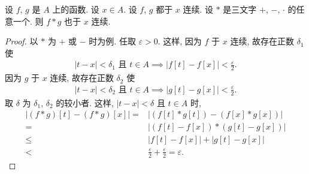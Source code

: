 \begin{theorem}
    设 $f$, $g$ 是 $A$ 上的函数. 设 $x \in A$. 设 $f$, $g$ 都于 $x$ 连续. 设 $\ast$ 是三文字 $+$, $-$, $\cdot$ 的任意一个. 则 $f \ast g$ 也于 $x$ 连续.
\end{theorem}

\begin{proof}
    以 $\ast$ 为 $+$ 或 $-$ 时为例. 任取 $\varepsilon > 0$. 这样, 因为 $f$ 于 $x$ 连续, 故存在正数 $\delta_1$ 使
    \begin{align*}
        \text{$|t - x| < \delta_1$ 且 $t \in A$} \implies |f[t] - f[x]| < \frac{\varepsilon}{2}.
    \end{align*}
    因为 $g$ 于 $x$ 连续, 故存在正数 $\delta_2$ 使
    \begin{align*}
        \text{$|t - x| < \delta_2$ 且 $t \in A$} \implies |g[t] - g[x]| < \frac{\varepsilon}{2}.
    \end{align*}
    取 $\delta$ 为 $\delta_1$, $\delta_2$ 的较小者. 这样, $|t - x| < \delta$ 且 $t \in A$ 时,
    \begin{align*}
        {|(f \ast g)[t] - (f \ast g)[x]|}
        = {}    & {|(f[t] \ast g[t]) - (f[x] \ast g[x])|}       \\
        = {}    & {|(f[t] - f[x]) \ast (g[t] - g[x])|}          \\
        \leq {} & {|f[t] - f[x]| + |g[t] - g[x]|}               \\
        < {}    & \frac{\varepsilon}{2} + \frac{\varepsilon}{2}
        = \varepsilon.
    \end{align*}


\end{proof}
